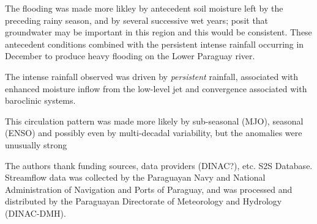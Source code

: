 \documentclass[twocol]{ametsoc}
\begin{document}
The flooding was made more likley by antecedent soil moisture left by the preceding rainy season, and by several successive wet years; \citet{Santos:2016td} posit that groundwater may be important in this region and this would be consistent. These antecedent conditions combined with the persistent intense rainfall occurring in December to produce heavy flooding on the Lower Paraguay river.

The intense rainfall observed was driven by \emph{persistent} rainfall, associated with enhanced moisture inflow from the low-level jet and convergence associated with baroclinic systems.

This circulation pattern was made more likely by sub-seasonal (MJO), seasonal (ENSO) and possibly even by multi-decadal variability, but the anomalies were unusually strong



\acknowledgments
The authors thank funding sources, data providers (DINAC?), etc. S2S Database.
Streamflow data was collected by the Paraguayan Navy and National Administration of Navigation and Ports of Paraguay, and was processed and distributed by the Paraguayan Directorate of Meteorology and Hydrology (DINAC-DMH).




\end{document}

